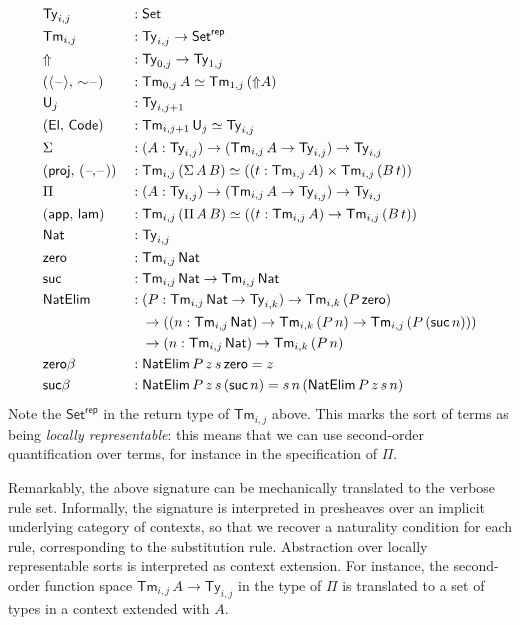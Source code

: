 \documentclass[acmsmall,screen,nonacm]{acmart}
\newcommand{\msf}[1]{\mathsf{#1}}
\newcommand{\Code}{\msf{Code}}
\newcommand{\El}{\msf{El}}
\newcommand{\lam}{\msf{lam}}
\newcommand{\app}{\msf{app}}
\newcommand{\Lift}{{\Uparrow}}
\newcommand{\spl}{{\sim}}
\newcommand{\qut}[1]{\langle #1\rangle}
\newcommand{\U}{\msf{U}}
\newcommand{\Ty}{\msf{Ty}}
\newcommand{\Tm}{\msf{Tm}}
\newcommand{\Nat}{\msf{Nat}}
\newcommand{\zero}{\msf{zero}}
\newcommand{\suc}{\msf{suc}}
\newcommand{\Set}{\mathsf{Set}}
\newcommand{\blank}{{\mathord{\hspace{1pt}\text{--}\hspace{1pt}}}}
\theoremstyle{remark}
\begin{document}
\begingroup
\allowdisplaybreaks
\begin{alignat*}{5}
  &\Ty_{i,j} &&: \Set\\
  &\Tm_{i,j} &&: \Ty_{i,j} \to \Set^{\msf{rep}} \\
  &\Lift    &&: \Ty_{0,j} \to \Ty_{1,j} \\
  &(\qut{\blank},\,\spl{\blank}) &&: \Tm_{0,j}\,A \simeq \Tm_{1,j}\,(\Lift A)\\
  &\U_j     &&: \Ty_{i,j+1}\\
  &(\El,\,\Code) &&: \Tm_{i,j+1}\,\U_j \simeq \Ty_{i,j}\\
  & \Sigma &&: (A : \Ty_{i,j}) \to (\Tm_{i,j}\,A \to \Ty_{i,j}) \to \Ty_{i,j} \\
  &(\msf{proj},\,(\blank\!,\!\blank)) &&: \Tm_{i,j}\,(\Sigma\,A\,B) \simeq ((t : \Tm_{i,j}\,A) \times \Tm_{i,j}\,(B\,t))\\
  &\Pi &&: (A : \Ty_{i,j}) \to (\Tm_{i,j}\,A \to \Ty_{i,j}) \to \Ty_{i,j}\\
  &(\app,\,\lam) &&: \Tm_{i,j}\,(\Pi\,A\,B) \simeq ((t : \Tm_{i,j}\,A) \to \Tm_{i,j}\,(B\,t))\\
  &\Nat &&: \Ty_{i,j} \\
  &\zero &&: \Tm_{i,j}\,\Nat \\
  &\suc  &&: \Tm_{i,j}\,\Nat \to \Tm_{i,j}\,\Nat \\
  &\msf{NatElim} &&: (P : \Tm_{i,j}\,\Nat \to \Ty_{i,k}) \to \Tm_{i,k}\,(P\,\zero) \\
  & && \hspace{0.8em}\to ((n : \Tm_{i,j}\,\Nat) \to \Tm_{i,k}\,(P\,n) \to \Tm_{i,j}\,(P\,(\suc\,n))) \\
  & && \hspace{0.8em}\to (n : \Tm_{i,j}\,\Nat) \to \Tm_{i,k}\,(P\,n)\\
  & \zero\beta &&: \msf{NatElim}\,P\,z\,s\,\zero = z \\
  & \suc\beta  &&: \msf{NatElim}\,P\,z\,s\,(\suc\,n) = s\,n\,(\msf{NatElim}\,P\,z\,s\,n)
\end{alignat*}
\endgroup
Note the $\Set^{\msf{rep}}$ in the return type of $\Tm_{i,j}$ above. This marks
the sort of terms as being \emph{locally representable}: this means that we can use
second-order quantification over terms, for instance in the specification of $\Pi$.

Remarkably, the above signature can be mechanically translated to the verbose
rule set. Informally, the signature is interpreted in presheaves over an
implicit underlying category of contexts, so that we recover a naturality
condition for each rule, corresponding to the substitution rule. Abstraction
over locally representable sorts is interpreted as context extension. For
instance, the second-order function space $\Tm_{i,j}\,A \to \Ty_{i,j}$ in the
type of $\Pi$ is translated to a set of types in a context extended with $A$.



\end{document}
